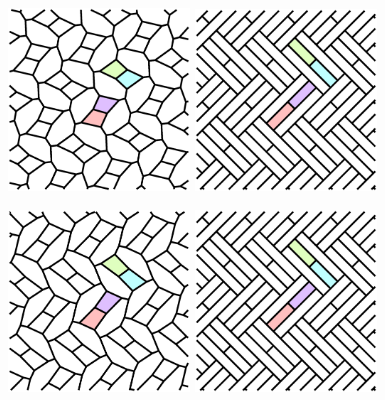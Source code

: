 \documentclass{beamer}
\begin{document}
\begin{frame}
  \begin{center}
    \includegraphics[width=1.9in]{c09}
    \includegraphics[width=1.9in]{c12}
  \end{center}
\end{frame}

\begin{frame}
  \begin{center}
    \includegraphics[width=1.9in]{c10}
    \includegraphics[width=1.9in]{c12}
  \end{center}
\end{frame}
\end{document}
